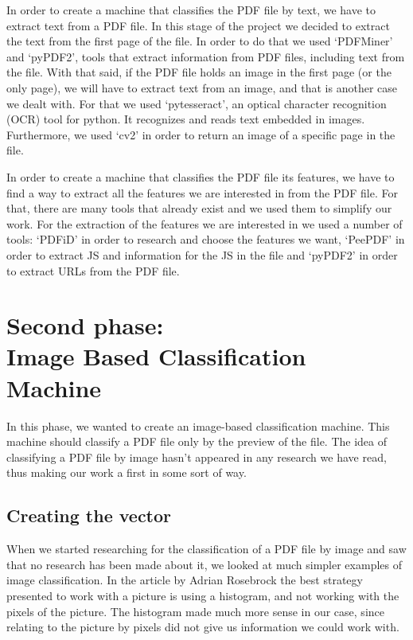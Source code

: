 \documentclass{article}
\begin{document}
\indent In order to create a machine that classifies the PDF file by text, we have to extract text from a PDF file. In this stage of the project we decided to extract the text from the first page of the file. In order to do that we used ‘PDFMiner’ and ‘pyPDF2’, tools that extract information from PDF files, including text from the file. With that said, if the PDF file holds an image in the first page (or the only page), we will have to extract text from an image, and that is another case we dealt with. For that we used ‘pytesseract’, an optical character recognition (OCR) tool for python. It recognizes and reads text embedded in images. Furthermore, we used ‘cv2’ in order to return an image of a specific page in the file.

\indent In order to create a machine that classifies the PDF file its features, we have to find a way to extract all the features we are interested in from the PDF file. For that, there are many tools that already exist and we used them to simplify our work. For the extraction of the features we are interested in we used a number of tools: ‘PDFiD’ in order to research and choose the features we want, ‘PeePDF’ in order to extract JS and information for the JS in the file and ‘pyPDF2’ in order to extract URLs from the PDF file.

\section[Second phase: Image Based Classification Machine]{Second phase: \\ Image Based Classification Machine}
\indent In this phase, we wanted to create an image-based classification machine. This machine should classify a PDF file only by the preview of the file. The idea of classifying a PDF file by image hasn't appeared in any research we have read, thus making our work a first in some sort of way.

\subsection{Creating the vector}
\indent When we started researching for the classification of a PDF file by image and saw that no research has been made about it, we looked at much simpler examples of image classification. In the article by Adrian Rosebrock \cite{HistogramImage} the best strategy presented to work with a picture is using a histogram, and not working with the pixels of the picture. The histogram made much more sense in our case, since relating to the picture by pixels did not give us information we could work with.
\end{document}
